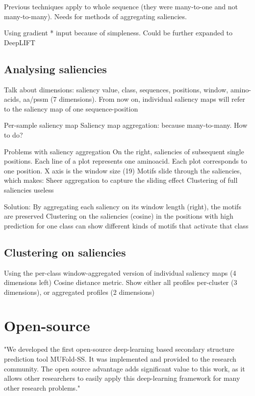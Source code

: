 Previous techniques apply to whole sequence (they were many-to-one and not many-to-many). Needs for methods of aggregating saliencies.

Using gradient * input because of simpleness. Could be further expanded to DeepLIFT

	\subsection{Analysing saliencies}
	Talk about dimensions: saliency value, class, sequences, positions, window, amino-acids, aa/pssm (7 dimensions). From now on, individual saliency maps will refer to the saliency map of one sequence-position
	
	Per-sample saliency map
	Saliency map aggregation: because many-to-many. How to do?
	
	Problems with saliency aggregation %
	On the right, saliencies of subsequent single positions. Each line of a plot represents one aminoacid. Each plot corresponds to one position. X axis is the window size (19)
	Motifs slide through the saliencies, which makes:
	Sheer aggregation to capture the sliding effect
	Clustering of full saliencies useless 
	
	Solution:
	By aggregating each saliency on its window length (right), the motifs are preserved %
	Clustering on the saliencies (cosine) in the positions with high prediction for one class can show different kinds of motifs that activate that class
	 
		\subsection{Clustering on saliencies}
		Using the per-class window-aggregated version of individual saliency maps (4 dimensions left)
		Cosine distance metric.
		Show either all profiles per-cluster (3 dimensions), or aggregated profiles (2 dimensions)

\section{Open-source}
"We developed the first open-source deep-learning based secondary structure prediction tool MUFold-SS. It was implemented and provided to the research community. The open source advantage adds significant value to this work, as it allows other researchers to easily apply this deep-learning framework for many other research problems." \cite{Fang2017}